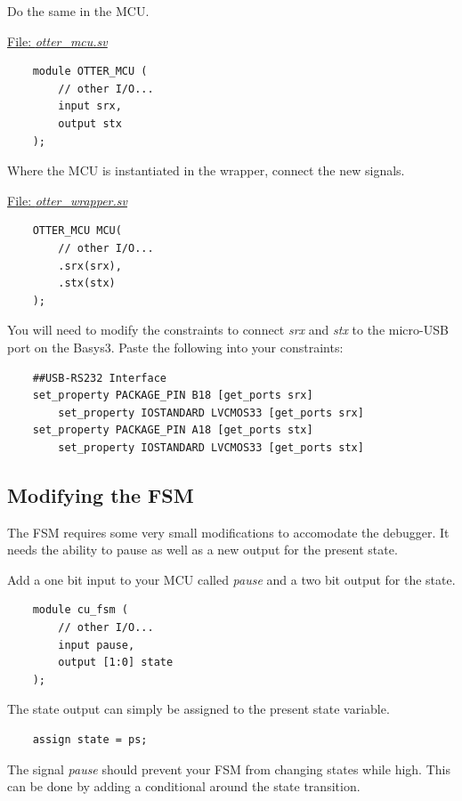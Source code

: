 \documentclass[10pt,a4paper]{article}
\begin{document}
\noindent Do the same in the MCU.

\medskip
\noindent\underline{File: \emph{otter\_mcu.sv}}
\begin{verbatim}
    module OTTER_MCU (
        // other I/O...
        input srx,
        output stx
    );
\end{verbatim}

\noindent Where the MCU is instantiated in the wrapper, connect the new signals.

\medskip
\noindent\underline{File: \emph{otter\_wrapper.sv}}
\begin{verbatim}
    OTTER_MCU MCU(
        // other I/O...
        .srx(srx),
        .stx(stx)
    );
\end{verbatim}

You will need to modify the constraints to connect \emph{srx} and \emph{stx} to the micro-USB port
on the Basys3. Paste the following into your constraints:

\begin{verbatim}
    ##USB-RS232 Interface
    set_property PACKAGE_PIN B18 [get_ports srx]						
        set_property IOSTANDARD LVCMOS33 [get_ports srx]
    set_property PACKAGE_PIN A18 [get_ports stx]						
        set_property IOSTANDARD LVCMOS33 [get_ports stx]
\end{verbatim}

\subsection{Modifying the FSM}
The FSM requires some very small modifications to accomodate the debugger. It needs the ability to
pause as well as a new output for the present state.

Add a one bit input to your MCU called \emph{pause} and a two bit output for the state.

\begin{verbatim}
    module cu_fsm (
        // other I/O...
        input pause,
        output [1:0] state
    );
\end{verbatim}

The state output can simply be assigned to the present state variable.

\begin{verbatim}
    assign state = ps;
\end{verbatim}

The signal \emph{pause} should prevent your FSM from changing states while high. This can be done
by adding a conditional around the state transition.
\end{document}
